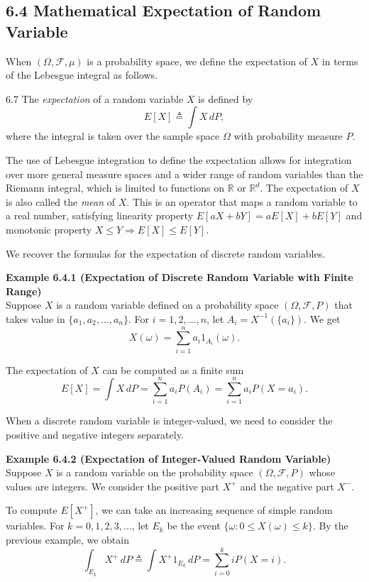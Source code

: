 \subsection*{6.4 Mathematical Expectation of Random Variable}

When $(\Omega,\mathcal{F},\mu)$ is a probability space, we define the expectation of $X$ in terms of the Lebesgue integral as follows.

\begin{defbox}{6.7}
The \textit{expectation} of a random variable $X$ is defined by
\[
E[X] \triangleq \int X\, dP,
\]
where the integral is taken over the sample space $\Omega$ with probability measure $P$.
\end{defbox}

The use of Lebesgue integration to define the expectation allows for integration over more general measure spaces and a wider range of random variables than the Riemann integral, which is limited to functions on $\mathbb{R}$ or $\mathbb{R}^d$. The expectation of $X$ is also called the \textit{mean} of $X$. This is an operator that maps a random variable to a real number, satisfying linearity property $E[aX+bY]=aE[X]+bE[Y]$ and monotonic property $X\le Y \Rightarrow E[X]\le E[Y]$.

We recover the formulas for the expectation of discrete random variables.

\textbf{Example 6.4.1 (Expectation of Discrete Random Variable with Finite Range)} \\
Suppose $X$ is a random variable defined on a probability space $(\Omega,\mathcal{F},P)$ that takes value in $\{a_1,a_2,\dots,a_n\}$. For $i=1,2,\dots,n$, let $A_i = X^{-1}(\{a_i\})$. We get
\[
X(\omega)=\sum_{i=1}^{n} a_i 1_{A_i}(\omega).
\]

The expectation of $X$ can be computed as a finite sum
\[
E[X]=\int X\, dP=\sum_{i=1}^{n} a_i P(A_i)=\sum_{i=1}^{n} a_i P(X=a_i).
\]

When a discrete random variable is integer-valued, we need to consider the positive and negative integers separately.

\textbf{Example 6.4.2 (Expectation of Integer-Valued Random Variable)} \\
Suppose $X$ is a random variable on the probability space $(\Omega,\mathcal{F},P)$ whose values are integers. We consider the positive part $X^+$ and the negative part $X^-$.

To compute $E[X^+]$, we can take an increasing sequence of simple random variables. For $k=0,1,2,3,\dots$, let $E_k$ be the event $\{\omega : 0\le X(\omega)\le k\}$. By the previous example, we obtain
\[
\int_{E_k} X^+\, dP \triangleq \int X^+1_{E_k}\, dP = \sum_{i=0}^{k} iP(X=i).
\]

